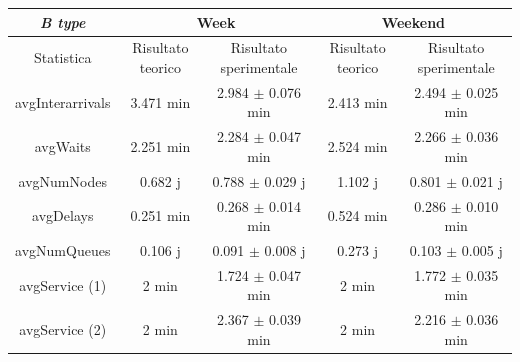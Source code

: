 \documentclass[a4paper, 12pt]{article}
\begin{document}
\begin{adjustbox}{width=\textwidth}
\centering
\begin{tabular}{ |c|c|c|c|c| }
\hline
\cellcolor{cellcolor} \textit{B type} & \multicolumn{2}{|c|}{\cellcolor{cellcolor}Week} & \multicolumn{2}{|c|}{\cellcolor{cellcolor}Weekend} \\
\hline
\cellcolor{cellcolor}Statistica & \cellcolor{cellcolor}Risultato teorico & \cellcolor{cellcolor}Risultato sperimentale & \cellcolor{cellcolor}Risultato teorico & \cellcolor{cellcolor}Risultato sperimentale \\
\hline
\hline
avgInterarrivals & 3.471 min & 2.984 $\pm$ 0.076 min & 2.413 min & 2.494 $\pm$ 0.025 min \\
\hline
avgWaits & 2.251 min & 2.284 $\pm$ 0.047 min & 2.524 min & 2.266 $\pm$ 0.036 min \\
\hline
avgNumNodes & 0.682 j & 0.788 $\pm$ 0.029 j & 1.102 j & 0.801 $\pm$ 0.021 j  \\
\hline
avgDelays & 0.251 min & 0.268 $\pm$ 0.014 min & 0.524 min & 0.286 $\pm$ 0.010 min \\
\hline
avgNumQueues & 0.106 j & 0.091 $\pm$ 0.008 j & 0.273 j & 0.103 $\pm$  0.005 j \\
\hline
avgService (1) & 2 min & 1.724 $\pm$ 0.047 min & 2 min & 1.772 $\pm$  0.035 min \\
\hline
avgService (2) & 2 min & 2.367 $\pm$ 0.039 min & 2 min & 2.216 $\pm$ 0.036 min \\
\hline
\end{tabular}
\end{adjustbox}
\bigskip
\end{document}
